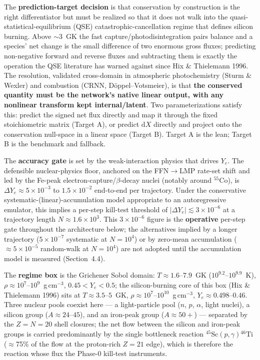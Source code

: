 \documentclass[11pt]{article}
\newcommand{\Ye}{Y_{e}}
\newcommand{\dYe}{\Delta Y_{e}}
\newcommand{\dd}{\mathrm{d}}
\begin{document}
The \textbf{prediction-target decision} is that conservation by construction is the right differentiator but must be realized so that it does not walk into the quasi-statistical-equilibrium (QSE) catastrophic-cancellation regime that defines silicon burning. Above $\sim$3~GK the fast capture/photodisintegration pairs balance and a species' net change is the small difference of two enormous gross fluxes; predicting non-negative forward and reverse fluxes and subtracting them is exactly the operation the QSE literature has warned against since Hix \& Thielemann 1996. The resolution, validated cross-domain in atmospheric photochemistry (Sturm \& Wexler) and combustion (CRNN, D\"oppel--Votsmeier), is that \textbf{the conserved quantity must be the network's native linear output, with any nonlinear transform kept internal/latent}. Two parameterizations satisfy this: predict the signed net flux directly and map it through the fixed stoichiometric matrix (Target A), or predict $\dd X$ directly and project onto the conservation null-space in a linear space (Target B). Target A is the lean; Target B is the benchmark and fallback.

The \textbf{accuracy gate} is set by the weak-interaction physics that drives $\Ye$. The defensible nuclear-physics floor, anchored on the FFN$\to$LMP rate-set shift and led by the Fe-peak electron-capture/$\beta$-decay nuclei (notably around ${}^{55}\mathrm{Co}$), is $\dYe \approx 5\times10^{-3}$ to $1.5\times10^{-2}$ end-to-end per trajectory. Under the conservative systematic-(linear)-accumulation model appropriate to an autoregressive emulator, this implies a per-step kill-test threshold of $|\dYe| \lesssim 3\times10^{-6}$ at a trajectory length $N \approx 1.6\times10^{3}$. This $3\times10^{-6}$ figure is the \textbf{operative} per-step gate throughout the architecture below; the alternatives implied by a longer trajectory ($5\times10^{-7}$ systematic at $N = 10^{4}$) or by zero-mean accumulation ($\approx 5\times10^{-5}$ random-walk at $N = 10^{4}$) are not adopted until the accumulation model is measured (Section~4.4).

The \textbf{regime box} is the Grichener Sobol domain: $T \approx 1.6$--$7.9$~GK ($10^{9.2}$--$10^{9.9}$~K), $\rho \approx 10^{7}$--$10^{9}$~g\,cm$^{-3}$, $0.45 < \Ye < 0.5$; the silicon-burning core of this box (Hix \& Thielemann 1996) sits at $T \approx 3.5$--$5$~GK, $\rho \approx 10^{7}$--$10^{10}$~g\,cm$^{-3}$, $\Ye \approx 0.498$--$0.46$. Three nuclear pools coexist here --- a light-particle pool ($n$, $p$, $\alpha$, light nuclei), a silicon group ($A \approx 24$--$45$), and an iron-peak group ($A \approx 50+$) --- separated by the $Z = N = 20$ shell closures; the net flow between the silicon and iron-peak groups is carried predominantly by the single bottleneck reaction ${}^{45}\mathrm{Sc}(p,\gamma){}^{46}\mathrm{Ti}$ ($\approx$75\% of the flow at the proton-rich $Z = 21$ edge), which is therefore the reaction whose flux the Phase-0 kill-test instruments.
\end{document}
